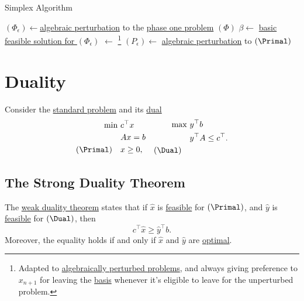 \begin{algorithm}[H]\label{algo:simplex-algorithm}
	\DontPrintSemicolon{}
	\caption{Simplex Algorithm}
	\BlankLine

	\((\Phi_{\epsilon})\gets\)\hyperref[def:perturbed-problem]{algebraic perturbation} to the \hyperref[def:phase-one-problem]{phase one problem} \((\Phi)\)\;
	\(\beta \gets \) \hyperref[prob:phase-one-problem]{basic feasible solution for \((\Phi_{\epsilon })\)}\;
	\result \(\gets\) \WFSimplex{\((\Phi _\epsilon )\), \(\beta\)}\footnote{Adapted to \hyperref[def:perturbed-problem]{algebraically perturbed problems}, and always giving preference to \(x_{n+1}\) for leaving the \hyperref[def:basis]{basis} whenever it's eligible to leave for the unperturbed problem.}\;
	\;
	\((P_{\epsilon} )\gets\) \hyperref[def:perturbed-problem]{algebraic perturbation} to \((\Primal)\)\;
\end{algorithm}

\chapter{Duality}
Consider the \hyperref[def:standard-form]{standard problem} and its \hyperref[def:dual]{dual}
\[
	\begin{aligned}
		\min~          & c^{\top}x \\
		               & Ax = b    \\
		(\Primal)\quad & x\geq  0,
	\end{aligned}\quad \begin{aligned}
		\max ~       & y^{\top}b               \\
		             & y^{\top}A\leq c^{\top}. \\
		(\Dual)\quad &
	\end{aligned}
\]

\section{The Strong Duality Theorem}
\begin{prev}
	The \hyperref[thm:weak-duality]{weak duality theorem} states that if \(\hat{x}\) is \hyperref[def:feasible-solution]{feasible} for \((\Primal)\), and \(\hat{y}\) is \hyperref[def:feasible-solution]{feasible} for \((\Dual)\), then
	\[
		c^{\top} \hat{x} \geq  \hat{y}^{\top} b.
	\]
	Moreover, the equality holds if and only if \(\hat{x}\) and \(\hat{y}\) are \hyperref[def:optimal-solution]{optimal}.
\end{prev}

